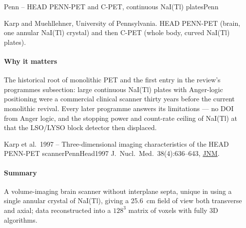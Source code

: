  

\begin{programnote}{Penn -- HEAD PENN-PET and C-PET, continuous NaI(Tl) plates}{Penn}

Karp and Muehllehner, University of Pennsylvania. HEAD PENN-PET (brain, one
annular NaI(Tl) crystal) and then C-PET (whole body, curved NaI(Tl) plates).

\paragraph{Why it matters}
The historical root of monolithic PET and the first entry in the review's
programmes subsection: large continuous NaI(Tl) plates with Anger-logic
positioning were a commercial clinical scanner thirty years before the current
monolithic revival. Every later programme answers its limitations --- no DOI from
Anger logic, and the stopping power and count-rate ceiling of NaI(Tl) at
 that the LSO/LYSO block detector then displaced.

\begin{papernote}{Karp et al.\ 1997 -- Three-dimensional imaging characteristics of the HEAD PENN-PET scanner}{PennHead1997}
J.\ Nucl.\ Med.\ 38(4):636--643, \href{https://jnm.snmjournals.org/content/38/4/636.long}{JNM}.

\paragraph{Summary}
A volume-imaging brain scanner without interplane septa, unique in using a
single annular crystal of NaI(Tl), giving a \qty{25.6}{\centi\metre} field of
view both transverse and axial; data reconstructed into a $128^3$ matrix of
 voxels with fully 3D algorithms.

\end{papernote}


\end{programnote}
